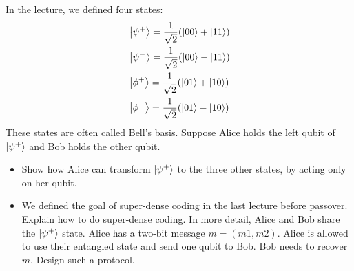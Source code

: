 In the lecture, we defined four states:
\begin{align*}
    &\ket{\psi^+} = \frac{1}{\sqrt{2}}(\ket{00} + \ket{11})\\
    &\ket{\psi^-} = \frac{1}{\sqrt{2}}(\ket{00} - \ket{11})\\
    &\ket{\phi^+} = \frac{1}{\sqrt{2}}(\ket{01} + \ket{10})\\
    &\ket{\phi^-} = \frac{1}{\sqrt{2}}(\ket{01} - \ket{10})\\
\end{align*}
These states are often called Bell’s basis.
Suppose Alice holds the left qubit of $\ket{\psi^+}$ and Bob holds the other qubit.
\begin{itemize}
    \item[a)] Show how Alice can transform $\ket{\psi^+}$ to the three other states, by acting only on her
    qubit.
    \item[b)] We defined the goal of super-dense coding in the last lecture before passover.
    Explain how to do super-dense coding.
    In more detail, Alice and Bob share the $\ket{\psi^+}$ state.
    Alice has a two-bit message $m = (m1, m2)$.
    Alice is allowed to use their entangled state and send one qubit to Bob.
    Bob needs to recover $m$.
    Design such a protocol.
\end{itemize}

